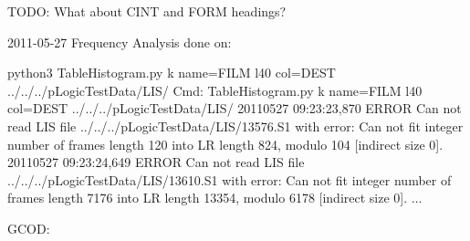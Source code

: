 \documentclass[letterpaper,10pt,english]{sphinxmanual}
\begin{document}
\begin{sphinxVerbatim}[commandchars=\\\{\}]
                                           
                                           
                                        
\end{sphinxVerbatim}

TODO: What about CINT and FORM headings?

2011-05-27 Frequency Analysis done on:

\begin{sphinxVerbatim}[commandchars=\\\{\}]
\PYGZdl{} python3 TableHistogram.py \PYGZhy{}k \PYGZhy{}\PYGZhy{}name=FILM \PYGZhy{}l40 \PYGZhy{}\PYGZhy{}col=DEST ../../../pLogicTestData/LIS/
Cmd: TableHistogram.py \PYGZhy{}k \PYGZhy{}\PYGZhy{}name=FILM \PYGZhy{}l40 \PYGZhy{}\PYGZhy{}col=DEST ../../../pLogicTestData/LIS/
2011\PYGZhy{}05\PYGZhy{}27 09:23:23,870 ERROR    Can not read LIS file ../../../pLogicTestData/LIS/13576.S1 with error: Can not fit integer number of frames length 120 into LR length 824, modulo 104 [indirect size 0].
2011\PYGZhy{}05\PYGZhy{}27 09:23:24,649 ERROR    Can not read LIS file ../../../pLogicTestData/LIS/13610.S1 with error: Can not fit integer number of frames length 7176 into LR length 13354, modulo 6178 [indirect size 0].
...
\end{sphinxVerbatim}

GCOD:
\end{document}
